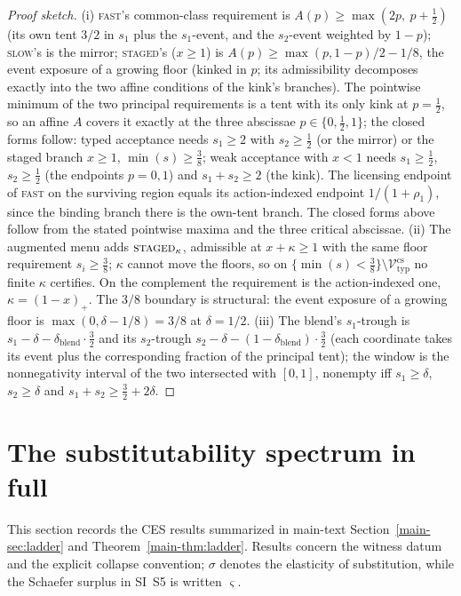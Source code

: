 \documentclass[preprint,11pt,authoryear]{elsarticle}
\theoremstyle{remark}
\newcommand{\Vtyp}{\mathcal{V}_{\mathrm{typ}}}
\newcommand{\act}[1]{\textsc{#1}}
\begin{document}
\begin{proof}[Proof sketch]
(i) \act{fast}'s common-class requirement is $A(p)\ge\max(2p,\ p+\tfrac12)$ (its own tent $3/2$ in $s_1$ plus the $s_1$-event, and the $s_2$-event weighted by $1-p$); \act{slow}'s is the mirror; \act{staged}'s ($x\ge1$) is $A(p)\ge\max(p,1-p)/2-1/8$, the event exposure of a growing floor (kinked in $p$; its admissibility decomposes exactly into the two affine conditions of the kink's branches). The pointwise minimum of the two principal requirements is a tent with its only kink at $p=\tfrac12$, so an affine $A$ covers it exactly at the three abscissae $p\in\{0,\tfrac12,1\}$; the closed forms follow: typed acceptance needs $s_1\ge2$ with $s_2\ge\tfrac12$ (or the mirror) or the staged branch $x\ge1$, $\min(s)\ge\tfrac38$; weak acceptance with $x<1$ needs $s_1\ge\tfrac12$, $s_2\ge\tfrac12$ (the endpoints $p=0,1$) and $s_1+s_2\ge2$ (the kink). The licensing endpoint of \act{fast} on the surviving region equals its action-indexed endpoint $1/(1+\rho_1)$, since the binding branch there is the own-tent branch. The closed forms above follow from the stated pointwise maxima and the three critical abscissae.
(ii) The augmented menu adds $\act{staged}_\kappa$, admissible at $x+\kappa\ge1$ with the same floor requirement $s_i\ge\tfrac38$; $\kappa$ cannot move the floors, so on $\{\min(s)<\tfrac38\}\setminus\Vtyp^{\mathrm{cs}}$ no finite $\kappa$ certifies. On the complement the requirement is the action-indexed one, $\kappa=(1-x)_+$. The $3/8$ boundary is structural: the event exposure of a growing floor is $\max(0,\delta-1/8)=3/8$ at $\delta=1/2$.
(iii) The blend's $s_1$-trough is $s_1-\delta-\delta_{\mathrm{blend}}\cdot\tfrac32$ and its $s_2$-trough $s_2-\delta-(1-\delta_{\mathrm{blend}})\cdot\tfrac32$ (each coordinate takes its event plus the corresponding fraction of the principal tent); the window is the nonnegativity interval of the two intersected with $[0,1]$, nonempty iff $s_1\ge\delta$, $s_2\ge\delta$ and $s_1+s_2\ge\tfrac32+2\delta$.
\end{proof}

\section{The substitutability spectrum in full}\label{si:spectrum}

This section records the CES results summarized in main-text Section~\ref{main-sec:ladder} and Theorem~\ref{main-thm:ladder}. Results concern the witness datum and the explicit collapse convention; $\sigma$ denotes the elasticity of substitution, while the Schaefer surplus in SI~S5 is written $\varsigma$.
\end{document}
